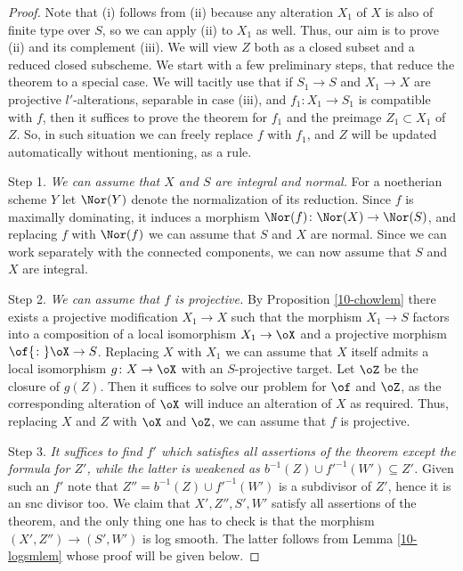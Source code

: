 \documentclass[10pt]{../fichiers-configuration-latex/smfart}
\begin{document}
\begin{proof}
Note that (i) follows from (ii) because any alteration $X_1$ of $X$ is also of finite type
over $S$, so we can apply (ii) to $X_1$ as well. Thus, our aim is to prove (ii) and its
complement (iii). We will view $Z$ both as a closed subset and a reduced closed subscheme.
We start with a few preliminary steps, that reduce the theorem to a special case. We will
tacitly use that if $S_1\to S$ and $X_1\to X$ are projective $l'$-alterations, separable in
case (iii), and $f_1{\colon}X_1\to S_1$ is compatible with $f$, then it suffices to prove the
theorem for $f_1$ and the preimage $Z_1\subset X_1$ of $Z$. So, in such situation we can freely
replace $f$ with $f_1$, and $Z$ will be updated automatically without mentioning, as a rule.

Step 1. {\it We can assume that $X$ and $S$ are integral and normal.} For a noetherian scheme
$Y$ let $\Nor(Y)$ denote the normalization of its reduction. Since $f$ is maximally dominating,
it induces a morphism $\Nor(f){\colon}\Nor(X)\to\Nor(S)$, and replacing $f$ with $\Nor(f)$ we can
assume that $S$ and $X$ are normal. Since we can work separately with the connected components,
we can now assume that $S$ and $X$ are integral.

Step 2. {\it We can assume that $f$ is projective.} By Proposition \ref{10-chowlem} there exists
a projective modification $X_1\to X$ such that the morphism $X_1\to S$ factors into a composition
of a local isomorphism $X_1\to\oX$ and a projective morphism $\of{\colon}\oX\to S$. Replacing $X$
with $X_1$ we can assume that $X$ itself admits a local isomorphism $g{\colon}X\to\oX$ with an
$S$-projective target. Let $\oZ$ be the closure of $g(Z)$. Then it suffices to solve our problem
for $\of$ and $\oZ$, as the corresponding alteration of $\oX$ will induce an alteration of $X$
as required. Thus, replacing $X$ and $Z$ with $\oX$ and $\oZ$, we can assume that $f$ is projective.

Step 3. {\it It suffices to find $f'$ which satisfies all assertions of the theorem except the
formula for $Z'$, while the latter is weakened as $b^{-1}(Z)\cup f'^{-1}(W')\subseteq Z'$.} Given
such an $f'$ note that $Z''=b^{-1}(Z)\cup f'^{-1}(W')$ is a subdivisor of $Z'$, hence it is an snc
divisor too. We claim that $X',Z'',S',W'$ satisfy all assertions of the theorem, and the only thing
one has to check is that the morphism $(X',Z'')\to(S',W')$ is log smooth. The latter follows from
Lemma \ref{10-logsmlem} whose proof will be given below.


\end{proof}
\end{document}
